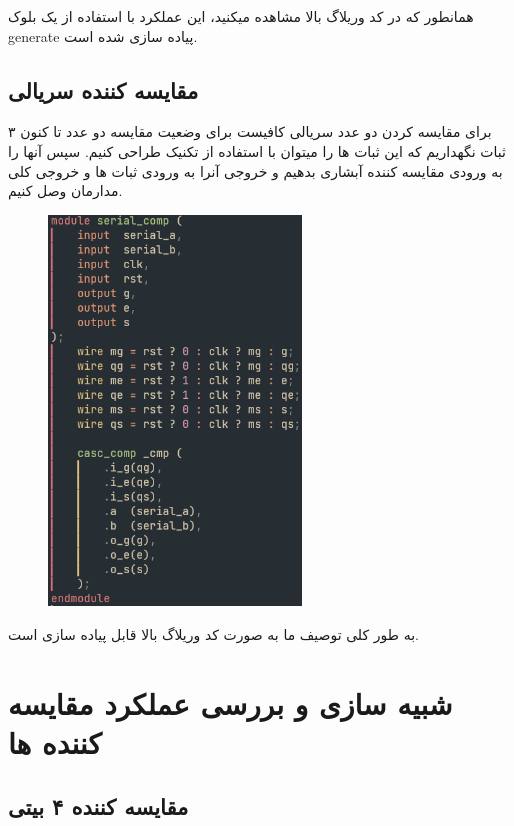 \documentclass{article}
\begin{document}
همانطور که در کد وریلاگ بالا مشاهده میکنید، این عملکرد با استفاده از یک
بلوک generate پیاده سازی شده است.


\subsection{مقایسه کننده سریالی}

برای مقایسه کردن دو عدد سریالی کافیست برای وضعیت مقایسه دو عدد تا کنون 
۳
ثبات نگهداریم که این ثبات ها را میتوان با استفاده از تکنیک
طراحی کنیم.
سپس آنها را به ورودی مقایسه کننده آبشاری بدهیم و خروجی آنرا به ورودی 
ثبات ها و خروجی کلی مدارمان وصل کنیم.

\begin{figure}[H]
    \centering
    \includegraphics[width=0.6\textwidth]{./serial_comp.png}
\end{figure}

به طور کلی توصیف ما به صورت کد وریلاگ بالا قابل پیاده سازی است.

\section{شبیه سازی و بررسی عملکرد مقایسه کننده ها}


\subsection{مقایسه کننده ۴ بیتی}
\end{document}
